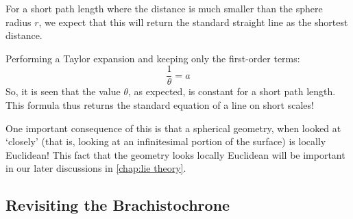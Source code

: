 \begin{example}
For a short path length where the distance is much smaller than the sphere radius $r$, we expect that this will return the standard straight line as the shortest distance.

Performing a Taylor expansion and keeping only the first-order terms:
$$\frac{1}{\theta}=a$$
So, it is seen that the value $\theta$, as expected, is constant for a short path length. This formula thus returns the standard equation of a line on short scales!

One important consequence of this is that a spherical geometry, when looked at `closely' (that is, looking at an infinitesimal portion of the surface) is locally Euclidean! This fact that the geometry looks locally Euclidean will be important in our later discussions in \autoref{chap:lie theory}.
\end{example}
 
\subsection{Revisiting the Brachistochrone}

